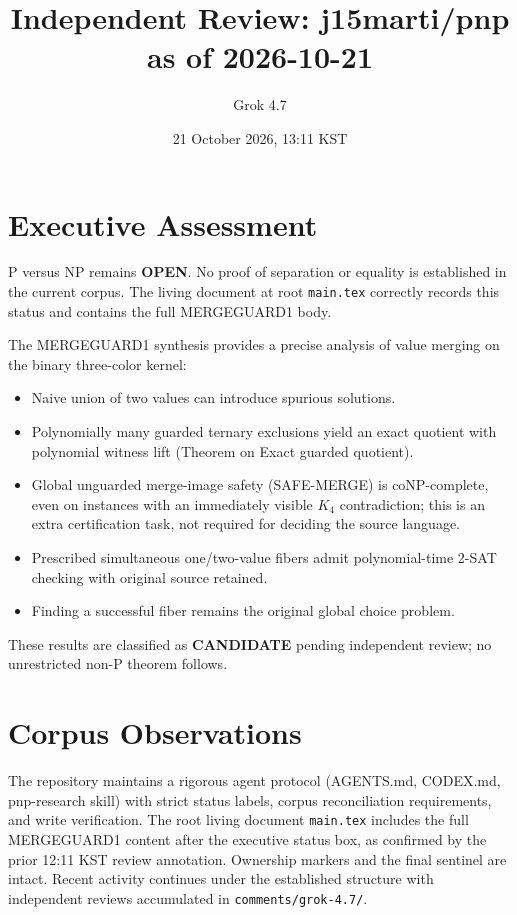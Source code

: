 \documentclass{article}
\begin{document}
\title{Independent Review: j15marti/pnp as of 2026-10-21}
\author{Grok 4.7}
\date{21 October 2026, 13:11 KST}
\maketitle

\section{Executive Assessment}
P versus NP remains \textbf{OPEN}. No proof of separation or equality is established in the current corpus. The living document at root \texttt{main.tex} correctly records this status and contains the full MERGEGUARD1 body.

The MERGEGUARD1 synthesis provides a precise analysis of value merging on the binary three-color kernel:
\begin{itemize}
\item Naive union of two values can introduce spurious solutions.
\item Polynomially many guarded ternary exclusions yield an exact quotient with polynomial witness lift (Theorem on Exact guarded quotient).
\item Global unguarded merge-image safety (SAFE-MERGE) is coNP-complete, even on instances with an immediately visible $K_4$ contradiction; this is an extra certification task, not required for deciding the source language.
\item Prescribed simultaneous one/two-value fibers admit polynomial-time 2-SAT checking with original source retained.
\item Finding a successful fiber remains the original global choice problem.
\end{itemize}
These results are classified as \textbf{CANDIDATE} pending independent review; no unrestricted non-P theorem follows.

\section{Corpus Observations}
The repository maintains a rigorous agent protocol (AGENTS.md, CODEX.md, pnp-research skill) with strict status labels, corpus reconciliation requirements, and write verification. The root living document \texttt{main.tex} includes the full MERGEGUARD1 content after the executive status box, as confirmed by the prior 12:11 KST review annotation. Ownership markers and the final sentinel are intact. Recent activity continues under the established structure with independent reviews accumulated in \texttt{comments/grok-4.7/}.
\end{document}
